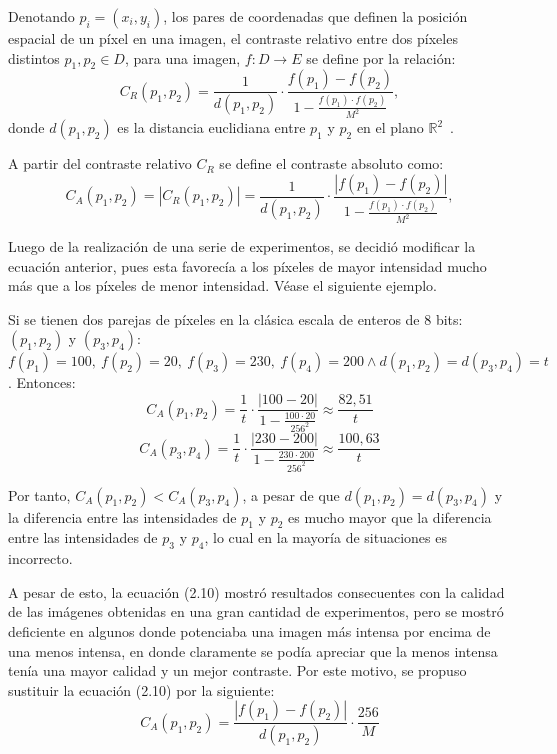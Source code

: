 Denotando $p_i =(x_i ,y_i )$, los pares de coordenadas que definen la posición espacial de un píxel en una imagen, el contraste relativo entre dos píxeles distintos $p_1, p_2 \in D$, para una imagen, $f : D \to E$ se define por la relación:
\begin{equation}
	C_R(p_1,p_2)=\frac{1}{d(p_1,p_2)}\cdot\frac{f(p_1)-f(p_2)}{1-\frac{f(p_1)\cdot f(p_2)}{M^2}},
\end{equation}
donde $d(p_1 ,p_2)$ es la distancia euclidiana entre $p_1$ y $p_2$ en el plano $\mathbb{R}^2$~\cite{patrascu2014mathematical}.

A partir del contraste relativo $C_R$ se define el contraste absoluto como:
\begin{equation}
	C_A(p_1,p_2)=|C_R(p_1,p_2)|=\frac{1}{d(p_1,p_2)}\cdot\frac{|f(p_1)-f(p_2)|}{1-\frac{f(p_1)\cdot f(p_2)}{M^2}},
\end{equation}

Luego de la realizaci\'on de una serie de experimentos, se decidi\'o modificar la ecuaci\'on anterior, pues esta favorec\'ia a los p\'ixeles de mayor intensidad mucho m\'as que a los p\'ixeles de menor intensidad. V\'ease el siguiente ejemplo.

Si se tienen dos parejas de p\'ixeles en la cl\'asica escala de enteros de 8 bits: $(p_1,p_2)$ y $(p_3,p_4)$: $f(p_1)=100,~f(p_2)=20,~f(p_3)=230,~f(p_4)=200 \land d(p_1,p_2)=d(p_3,p_4)=t$. Entonces:
\begin{equation}
	C_A(p_1,p_2)=\frac{1}{t}\cdot\frac{|100-20|}{1-\frac{100\cdot20}{256^2}}\approx\frac{82,51}{t}
\end{equation} 
\begin{equation}
	C_A(p_3,p_4)=\frac{1}{t}\cdot\frac{|230-200|}{1-\frac{230\cdot200}{256^2}}\approx\frac{100,63}{t}
\end{equation}

Por tanto, $C_A(p_1,p_2)<C_A(p_3,p_4)$, a pesar de que $d(p_1,p_2)=d(p_3,p_4)$ y la diferencia entre las intensidades de $p_1$ y $p_2$ es mucho mayor que la diferencia entre las intensidades de $p_3$ y $p_4$, lo cual en la mayor\'ia de situaciones es incorrecto.

A pesar de esto, la ecuaci\'on (2.10) mostr\'o resultados consecuentes con la calidad de las im\'agenes obtenidas en una gran cantidad de experimentos, pero se mostr\'o deficiente en algunos donde potenciaba una imagen m\'as intensa por encima de una menos intensa, en donde claramente se pod\'ia apreciar que la menos intensa ten\'ia una mayor calidad y un mejor contraste. Por este motivo, se propuso sustituir la ecuaci\'on (2.10) por la siguiente:
\begin{equation}
	C_A(p_1,p_2)=\frac{|f(p_1)-f(p_2)|}{d(p_1,p_2)}\cdot\frac{256}{M}
\end{equation}

